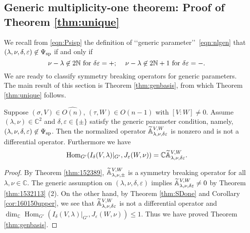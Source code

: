 \subsection{Generic multiplicity-one theorem:
 Proof of Theorem \ref{thm:unique}}
\label{subsec:generic}
We recall from \eqref{eqn:Psisp}
 the definition of \lq\lq{generic parameter}\rq\rq\
 \eqref{eqn:nlgen}
 that $(\lambda, \nu, \delta, \varepsilon) \not \in
 \Psi_{{\operatorname{sp}}}$
if and only if
\begin{equation*}
\text{
  $\nu - \lambda \not \in 2{\mathbb{N}}$
 for $\delta \varepsilon = +$;
\quad
  $\nu - \lambda \not \in 2{\mathbb{N}}+1$
 for $\delta \varepsilon = -$.
}
\end{equation*}
We are ready to classify symmetry breaking operators
 for generic parameters.  
The main result
 of this section 
 is Theorem \ref{thm:genbasis}, from which Theorem \ref{thm:unique}
 follows.  
\begin{theorem}
\label{thm:genbasis}
Suppose $(\sigma,V) \in \widehat{O(n)}$, 
 $(\tau,W) \in \widehat{O(n-1)}$
 with 
$
[V:W]\ne 0.  
$
Assume $(\lambda, \nu)\in {\mathbb{C}}^2$
 and $\delta, \varepsilon \in \{\pm \}$
 satisfy the 
 generic parameter condition, 
 namely, 
 $(\lambda, \nu, \delta, \varepsilon) \not \in
 \Psi_{{\operatorname{sp}}}$.  
Then the normalized operator ${\widetilde{\mathbb{A}}}_{{\lambda},{\nu},{\delta \varepsilon}}^{{V,W}}$ is nonzero
 and is not a differential operator.  
Furthermore we have
\[
    {\operatorname{Hom}}_{G'}
    (I_{\delta}(V,\lambda)|_{G'}, J_{\varepsilon}(W,\nu))
    =
   {\mathbb{C}} {\widetilde{\mathbb{A}}}_{{\lambda},{\nu},{\delta \varepsilon}}^{{V,W}}.  
\]
\end{theorem}

\begin{proof}
By Theorem \ref{thm:152389}, 
 ${\widetilde{\mathbb{A}}}_{{\lambda},{\nu},{\pm}}^{{V,W}}$ is a symmetry breaking operator
 for all $\lambda, \nu \in {\mathbb{C}}$.  
The generic assumption on $(\lambda, \nu, \delta, \varepsilon)$
 implies ${\widetilde{\mathbb{A}}}_{{\lambda},{\nu},{\delta \varepsilon}}^{{V,W}} \ne 0$
 by Theorem \ref{thm:1532113} (2).  
On the other hand,
 by Theorem \ref{thm:SDone} and Corollary \ref{cor:160150upper},
 we see that ${\widetilde{\mathbb{A}}}_{{\lambda},{\nu},{\delta \varepsilon}}^{{V,W}}$ is not 
 a differential operator
 and $\dim_{{\mathbb{C}}}{\operatorname{Hom}}_{G'}
    (I_{\delta}(V,\lambda)|_{G'}, J_{\varepsilon}(W,\nu)) \le 1$.  
Thus we have proved Theorem \ref{thm:genbasis}.  
\end{proof}

